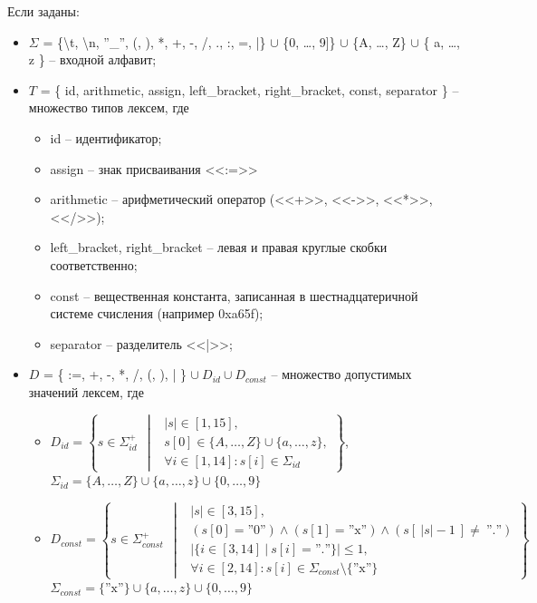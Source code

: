 \documentclass[a4paper,final]{article}
\begin{document}
Если заданы:
\begin{itemize}
    \item $\displaystyle \Sigma$ = \{\textbackslash t, \textbackslash n, ''\_'', (, ), *, +, -, /, ., :, =, |\} $\cup$ \{0, \dots, 9]\} $\cup$ \{A, \dots, Z\} $\cup$ \{ a, \dots, z \} -- входной алфавит;
    \item $\displaystyle T$ = \{ id, arithmetic, assign, left\_bracket, right\_bracket, const, separator \} -- множество типов лексем, где
    \begin{itemize}
        \item id -- идентификатор;
        \item assign -- знак присваивания <<:=>>
        \item arithmetic -- арифметический оператор (<<+>>, <<->>, <<*>>, <</>>);
        \item left\_bracket, right\_bracket -- левая и правая круглые скобки соответственно;
        \item const -- вещественная константа, записанная в шестнадцатеричной системе счисления (например 0xa65f);
        \item separator -- разделитель <<|>>;
    \end{itemize}
    \item $D$ = \{ :=, +, -, *, /, (, ), | \} $\cup ~D_{id} \cup D_{const}$ -- множество допустимых значений лексем, где
    \begin{itemize}
        \item $D_{id} = \left\{s \in \Sigma_{id}^+~~ \middle|~~\begin{array}{l}
            |s| \in [1, 15], \\
            s[0] \in \{A, \dots, Z\} \cup \{ a, \dots, z \}, \\
            \forall i \in [1, 14]: s[i] \in \Sigma_{id}
        \end{array}
        \right\}$,\\[1em]
        $\Sigma_{id} = \{A, \dots, Z\} \cup \{ a, \dots, z \} \cup \{ 0, \dots, 9 \}$
        \item $D_{const} = \left\{s \in \Sigma_{const}^+~~ \middle|~~\begin{array}{l}
            |s| \in [3, 15], \\
            (s[0] = \text{''0''}) \wedge (s[1] = \text{''x''}) \wedge (s[~|s| - 1~] \neq ~\text{''.''})\\
            |\{ i \in [3, 14] ~|~ s[i] = \text{''.''}\}| \leq 1,\\
            \forall i \in [2, 14]: s[i] \in \Sigma_{const} \setminus \{ \text{''x''} \}
        \end{array}
        \right\}$\\[1em]
        $\Sigma_{const} = \{\text{''x''}\} \cup \{ a, \dots, z \} \cup \{ 0, \dots, 9 \}$
    \end{itemize}
\end{itemize}
\end{document}
